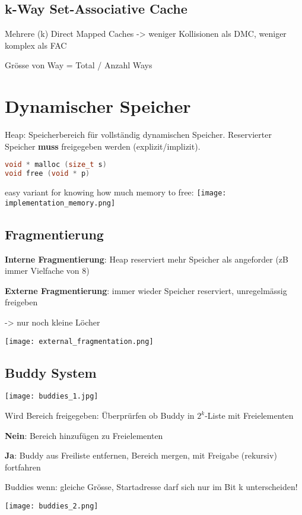 \begin{multicols*}{4}
\subsection{k-Way Set-Associative Cache}
Mehrere (k) Direct Mapped Caches -> weniger Kollisionen als DMC, weniger komplex als FAC

Grösse von Way = Total / Anzahl Ways

\section{Dynamischer Speicher}
Heap: Speicherbereich für vollständig dynamischen Speicher. Reservierter Speicher \textbf{muss} freigegeben werden (explizit/implizit).

\begin{lstlisting}[language=c]
void * malloc (size_t s)
void free (void * p)
\end{lstlisting}

easy variant for knowing how much memory to free:
\texttt{[image: implementation\_memory.png]}

\subsection{Fragmentierung}
\textbf{Interne Fragmentierung}: Heap reserviert mehr Speicher als angeforder (zB immer Vielfache von 8)

\textbf{Externe Fragmentierung}: immer wieder Speicher reserviert, unregelmässig freigeben

-> nur noch kleine Löcher

\texttt{[image: external\_fragmentation.png]}

\subsection{Buddy System}

\texttt{[image: buddies\_1.jpg]}

Wird Bereich freigegeben: Überprürfen ob Buddy in \(2^k\)-Liste mit Freielementen

\textbf{Nein}: Bereich hinzufügen zu Freielementen

\textbf{Ja}: Buddy aus Freiliste entfernen, Bereich mergen, mit Freigabe (rekursiv) fortfahren

Buddies wenn: gleiche Grösse, Startadresse darf sich nur im Bit k unterscheiden!

\hfill\texttt{[image: buddies\_2.png]}


\end{multicols*}
